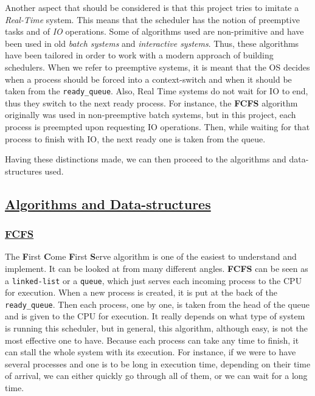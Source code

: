 \documentclass{article}
\newcommand{\code}[1]{\colorbox{codebg}{{\color{black}\texttt{#1}}}}
\begin{document}
Another aspect that should be considered is that this project tries to imitate a \textit{Real-Time} system. This means that the scheduler has the notion of preemptive tasks and of \textit{IO} operations. Some of algorithms used are non-primitive and have been used in old \textit{batch systems} and \textit{interactive systems}. Thus, these algorithms have been tailored in order to work with a modern approach of building schedulers. When we refer to preemptive systems, it is meant that the OS decides when a process should be forced into a context-switch and when it should be taken from the \code{ready\_queue}. Also, Real Time systems do not wait for IO to end, thus they switch to the next ready process. For instance, the \textbf{FCFS} algorithm originally was used in non-preemptive batch systems, but in this project, each process is preempted upon requesting IO operations. Then, while waiting for that process to finish with IO, the next ready one is taken from the queue.

Having these distinctions made, we can then proceed to the algorithms and data-structures used.

\subsection{\underline{Algorithms and Data-structures}}

\subsubsection{\underline{FCFS}}

The \textbf{F}irst \textbf{C}ome \textbf{F}irst \textbf{S}erve algorithm is one of the easiest to understand and implement. It can be looked at from many different angles. \textbf{FCFS} can be seen as a \code{linked-list} or a \code{queue}, which just serves each incoming process to the CPU for execution. When a new process is created, it is put at the back of the \code{ready\_queue}. Then each process, one by one, is taken from the head of the queue and is given to the CPU for execution. It really depends on what type of system is running this scheduler, but in general, this algorithm, although easy, is not the most effective one to have. Because each process can take any time to finish, it can stall the whole system with its execution. For instance, if we were to have several processes and one is to be long in execution time, depending on their time of arrival, we can either quickly go through all of them, or we can wait for a long time.
\end{document}
